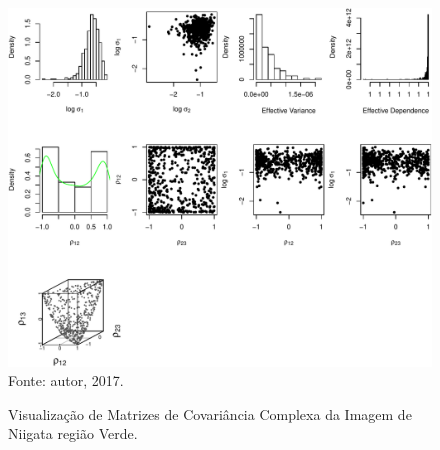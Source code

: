 \documentclass[journal]{IEEEtran}
\begin{document}
\newpage

\begin{figure}[ht]
\centering
\caption{Visualização de Matrizes de Covariância Complexa da Imagem de Niigata região Verde.}
\includegraphics[width=\linewidth]{../../Figuras/Amostras-Niigata/Niigata-Verde-500.pdf}\\
Fonte: autor, 2017.
\label{visNiigata4}
\end{figure}





\newpage
\end{document}
